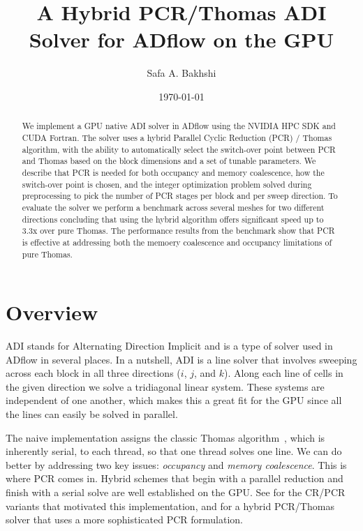 \documentclass[noinfobox]{mdolab-article}
\title{A Hybrid PCR/Thomas ADI Solver for ADflow on the GPU}
\author{Safa A. Bakhshi}
\affil{Department of Aerospace Engineering, University of Michigan, Ann Arbor, MI, 48109}
\date{\today}
\begin{document}
\maketitle

\begin{abstract}
We implement a GPU native ADI solver in ADflow using the NVIDIA HPC SDK and CUDA Fortran.
The solver uses a hybrid Parallel Cyclic Reduction (PCR) / Thomas algorithm, with the ability to automatically select the switch-over point between PCR and Thomas based on the block dimensions and a set of tunable parameters.
We describe that PCR is needed for both occupancy and memory coalescence, how the switch-over point is chosen, and the integer optimization problem solved during preprocessing to pick the number of PCR stages per block and per sweep direction.
To evaluate the solver we perform a benchmark across several meshes for two different directions concluding that using the hybrid algorithm offers significant speed up to 3.3x over pure Thomas.
The performance results from the benchmark show that PCR is effective at addressing both the memoery coalescence and occupancy limitations of pure Thomas.
\end{abstract}


\section{Overview}

ADI stands for Alternating Direction Implicit and is a type of solver used in ADflow in several places.
In a nutshell, ADI is a line solver that involves sweeping across each block in all three directions ($i$, $j$, and $k$).
Along each line of cells in the given direction we solve a tridiagonal linear system.
These systems are independent of one another, which makes this a great fit for the GPU since all the lines can easily be solved in parallel.

The naive implementation assigns the classic Thomas algorithm~\citep{Thomas1949}, which is inherently serial, to each thread, so that one thread solves one line.
We can do better by addressing two key issues: \emph{occupancy} and \emph{memory coalescence}.
This is where PCR comes in.
Hybrid schemes that begin with a parallel reduction and finish with a serial solve are well established on the GPU.
See \citet{Zhang2010} for the CR/PCR variants that motivated this implementation, and \citet{Kim2011} for a hybrid PCR/Thomas solver that uses a more sophisticated PCR formulation.
\end{document}
